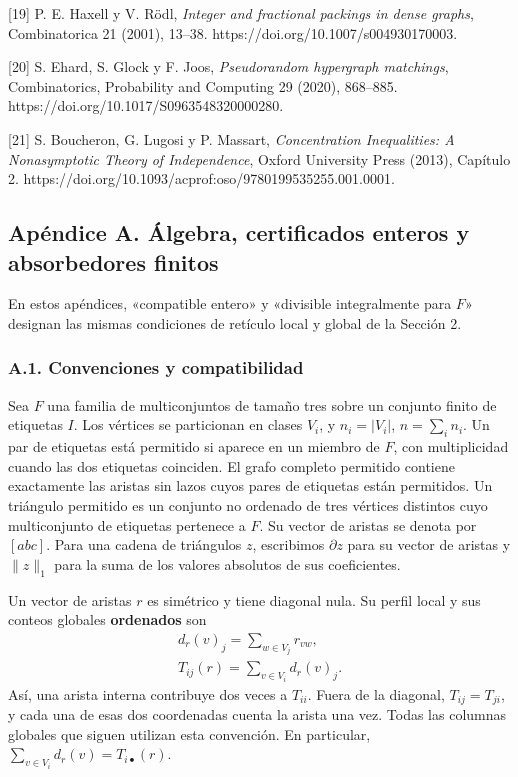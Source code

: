 \documentclass[spanish,11pt,a4paper]{article}
\begin{document}
{[}19{]} P. E. Haxell y V. Rödl, \emph{Integer and fractional packings in dense graphs}, Combinatorica 21 (2001), 13--38. https://doi.org/10.1007/s004930170003.

{[}20{]} S. Ehard, S. Glock y F. Joos, \emph{Pseudorandom hypergraph matchings}, Combinatorics, Probability and Computing 29 (2020), 868--885. https://doi.org/10.1017/S0963548320000280.

{[}21{]} S. Boucheron, G. Lugosi y P. Massart, \emph{Concentration Inequalities: A Nonasymptotic Theory of Independence}, Oxford University Press (2013), Capítulo 2. https://doi.org/10.1093/acprof:oso/9780199535255.001.0001.

\endgroup
\clearpage

\subsection{Apéndice A. Álgebra, certificados enteros y absorbedores finitos}\label{apuxe9ndice-a.-uxe1lgebra-certificados-enteros-y-absorbedores-finitos}

En estos apéndices, «compatible entero» y «divisible integralmente para \(F\)» designan las mismas condiciones de retículo local y global de la Sección 2.

\subsubsection{A.1. Convenciones y compatibilidad}\label{a.1.-convenciones-y-compatibilidad}

Sea \(F\) una familia de multiconjuntos de tamaño tres sobre un conjunto finito de etiquetas \(I\). Los vértices se particionan en clases \(V_i\), y \(n_i=|V_i|\), \(n=\sum_i n_i\). Un par de etiquetas está permitido si aparece en un miembro de \(F\), con multiplicidad cuando las dos etiquetas coinciden. El grafo completo permitido contiene exactamente las aristas sin lazos cuyos pares de etiquetas están permitidos. Un triángulo permitido es un conjunto no ordenado de tres vértices distintos cuyo multiconjunto de etiquetas pertenece a \(F\). Su vector de aristas se denota por \([abc]\). Para una cadena de triángulos \(z\), escribimos \(\partial z\) para su vector de aristas y \(\|z\|_1\) para la suma de los valores absolutos de sus coeficientes.

Un vector de aristas \(r\) es simétrico y tiene diagonal nula. Su perfil local y sus conteos globales \textbf{ordenados} son \[\begin{gathered}
d_r(v)_j=\sum_{w\in V_j}r_{vw},\\
T_{ij}(r)=\sum_{v\in V_i}d_r(v)_j.
\end{gathered}\] Así, una arista interna contribuye dos veces a \(T_{ii}\). Fuera de la diagonal, \(T_{ij}=T_{ji}\), y cada una de esas dos coordenadas cuenta la arista una vez. Todas las columnas globales que siguen utilizan esta convención. En particular, \(\sum_{v\in V_i}d_r(v)=T_{i\bullet}(r)\).
\end{document}
